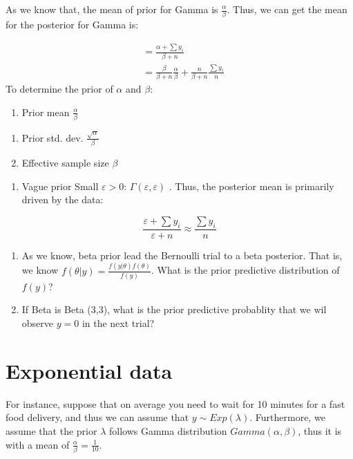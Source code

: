 \documentclass[]{book}
\providecommand{\tightlist}{%
  \setlength{\itemsep}{0pt}\setlength{\parskip}{0pt}}
\begin{document}
As we know that, the mean of prior for Gamma is
\(\frac{\alpha}{\beta}\). Thus, we can get the mean for the posterior
for Gamma is:

\[\begin{aligned} &=\frac{\alpha+\sum y_i}{\beta+n} \\ &= \frac{\beta}{\beta+n} \frac{\alpha}{\beta}+\frac{n}{\beta+n} \frac{\sum y_i}{n} \end{aligned}\]
To determine the prior of \(\alpha\) and \(\beta\):

\begin{enumerate}
\def\labelenumi{(\arabic{enumi})}
\tightlist
\item
  Prior mean \(\frac{\alpha}{\beta}\)
\end{enumerate}

\begin{enumerate}
\def\labelenumi{(\alph{enumi})}
\tightlist
\item
  Prior std. dev. \(\frac{\sqrt \alpha}{\beta}\)
\item
  Effective sample size \(\beta\)
\end{enumerate}

\begin{enumerate}
\def\labelenumi{(\arabic{enumi})}
\setcounter{enumi}{1}
\tightlist
\item
  Vague prior Small \(\varepsilon >0\):
  \(\Gamma (\varepsilon,\varepsilon)\) . Thus, the posterior mean is
  primarily driven by the data:
\end{enumerate}

\[\frac{\varepsilon + \sum y_i}{\varepsilon + n} \approx \frac{ \sum y_i}{n} \]

\begin{enumerate}
\def\labelenumi{(\arabic{enumi})}
\item
  As we know, beta prior lead the Bernoulli trial to a beta posterior.
  That is, we know \(f(\theta|y)=\frac{f(y|\theta) f(\theta)}{f(y)}\).
  What is the prior predictive distribution of \(f(y)\)?
\item
  If Beta is Beta (3,3), what is the prior predictive probablity that we
  wil observe \(y=0\) in the next trial?
\end{enumerate}

\section{Exponential data}\label{exponential-data}

For instance, suppose that on average you need to wait for 10 minutes
for a fast food delivery, and thus we can assume that
\(y \sim Exp(\lambda)\). Furthermore, we assume that the prior
\(\lambda\) follows Gamma distribution \(Gamma(\alpha, \beta)\), thus it
is with a mean of \(\frac{\alpha}{\beta}=\frac{1}{10}\).
\end{document}
